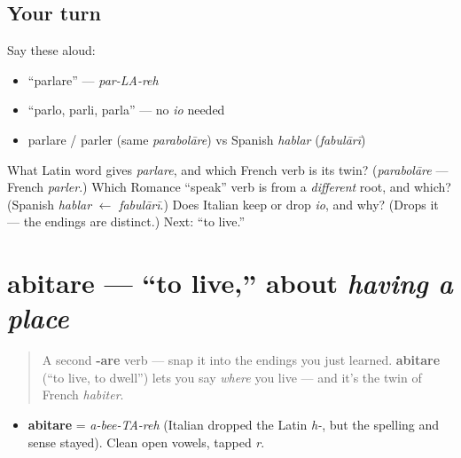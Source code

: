\subsection*{Your turn}
Say these aloud:

\begin{itemize}
\raggedright
  \item \textquotedblleft{}parlare\textquotedblright{} — \emph{par-LA-reh}
  \item \textquotedblleft{}parlo, parli, parla\textquotedblright{} — no \emph{io} needed
  \item parlare / parler (same \emph{parabolāre}) vs Spanish \emph{hablar} (\emph{fabulārī})
\end{itemize}

\begin{tcolorbox}[breakable,colback=teal!4,colframe=teal!35!black,title={Before you move on}]
What Latin word gives \emph{parlare}, and which French verb is its twin? (\emph{parabolāre} — French \emph{parler}.) Which Romance \textquotedblleft{}speak\textquotedblright{} verb is from a \emph{different} root, and which? (Spanish \emph{hablar} $\leftarrow$ \emph{fabulārī}.) Does Italian keep or drop \emph{io}, and why? (Drops it — the endings are distinct.) Next: \textquotedblleft{}to live.\textquotedblright{}
\end{tcolorbox}
\section[abitare]{abitare — \textquotedblleft{}to live,\textquotedblright{} about \emph{having a place}}

\label{lesson:IT-C05-abitare}



\begin{quote}
A second \textbf{-are} verb — snap it into the endings you just learned. \textbf{abitare} (\textquotedblleft{}to live, to dwell\textquotedblright{}) lets you say \emph{where} you live — and it's the twin of French \emph{habiter}.
\end{quote}

\begin{sounds}
\begin{itemize}
\raggedright
  \item \textbf{abitare} = \emph{a-bee-TA-reh} (Italian dropped the Latin \emph{h-}, but the spelling and sense stayed). Clean open vowels, tapped \emph{r}.
\end{itemize}
\end{sounds}

